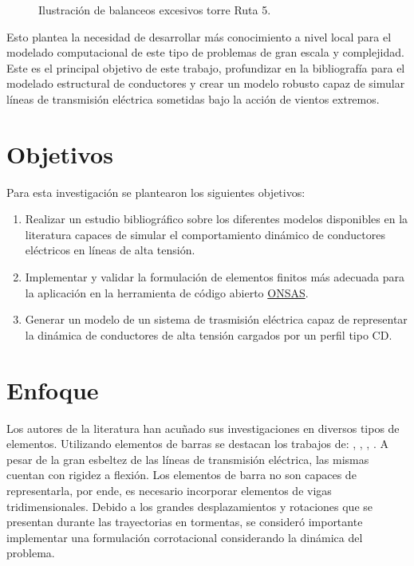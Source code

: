 \begin{figure}[htbp]
	\centering
	\def\svgwidth{80mm}
	
	\caption{Ilustración de balanceos excesivos torre Ruta 5.}
	\label{fig:INTRO:IlusExcesiveBalance}
\end{figure}  


Esto plantea la necesidad de desarrollar más conocimiento a nivel local para el modelado computacional de este tipo de problemas de gran escala y complejidad. Este es el principal objetivo de este trabajo, profundizar en la bibliografía para el modelado estructural de conductores y crear un modelo robusto capaz de simular líneas de transmisión eléctrica sometidas bajo la acción de vientos extremos.


\section{Objetivos}
Para esta investigación se plantearon los siguientes objetivos:
\begin{enumerate}
	\item Realizar un estudio bibliográfico sobre los diferentes modelos disponibles en la literatura capaces de simular el comportamiento dinámico de conductores eléctricos en líneas de alta tensión. 
	\item Implementar y validar la formulación de elementos finitos más adecuada para la aplicación en la herramienta de código abierto \href{https://github.com/ONSAS/ONSAS.m}{ONSAS}.
	\item Generar un modelo de un sistema de trasmisión eléctrica capaz de representar la dinámica de conductores de alta tensión cargados por un perfil tipo CD.
\end{enumerate}

\section{Enfoque}

Los autores de la literatura han acuñado sus investigaciones en diversos tipos de elementos. Utilizando elementos de barras se destacan los trabajos de: \cite{desai1995finite}, \cite{yan2009numerical}, \cite{gani2010dynamic}, \cite{yang2016nonlinear}. A pesar de la gran esbeltez de las líneas de transmisión eléctrica, las mismas cuentan con rigidez a flexión. Los elementos de barra no son capaces de representarla, por ende, es necesario incorporar elementos de vigas tridimensionales. Debido a los grandes desplazamientos y rotaciones que se presentan durante las trayectorias en tormentas, se consideró importante implementar una formulación corrotacional considerando la dinámica del problema.


